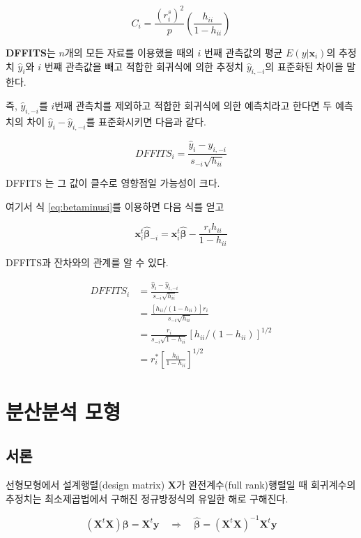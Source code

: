 \documentclass[
  10pt,
]{book}
\theoremstyle{definition}
\theoremstyle{definition}
\theoremstyle{definition}
\theoremstyle{definition}
\theoremstyle{remark}
\begin{document}
\[ C_i = \frac{ (r^s_i)^2}{p} \left ( \frac{h_{ii} }{1-h_{ii}} \right ) \]

\textbf{DFFITS}는 \(n\)개의 모든 자료를 이용했을 때의 \(i\) 번째 관측값의 평균
\(E(y|\bm x_i)\)의 추정치 \(\hat y_i\)와 \(i\) 번쨰 관측값을 빼고 적합한
회귀식에 의한 추정치 \(\hat y_{i,-i}\)의 표준화된 차이을 말한다.

즉, \(\hat y_{i,-i}\)를 \(i\)번째 관측치를 제외하고 적합한 회귀식에 의한
예측치라고 한다면 두 예측치의 차이 \(\hat y_i - \hat y_{i,-i}\)를
표준화시키면 다음과 같다.

\begin{equation}
 DFFITS_i = \frac{\hat y_i - \hat y_{i,-i}}{s_{-i}\sqrt{h_{ii}}}  
\label{eq:dffits}
\end{equation}

DFFITS 는 그 값이 클수로 영향점일 가능성이 크다.

여기서 식 \eqref{eq:betaminusi}를 이용하면 다음 식를 얻고

\[ {\bm x}_i^t \hat{ \bm \beta}_{-i} =\bm x_i^t \hat{ \bm \beta} -\frac{r_i h_{ii}}{1-h_{ii}}\]

DFFITS과 잔차와의 관계를 알 수 있다.

\begin{align*}
DFFITS_i & = \frac{\hat y_i - \hat y_{i,-i}}{s_{-i}\sqrt{h_{ii}}}  \\
& =  \frac{ [h_{ii}/(1-h_{ii})]r_i } {s_{-i}\sqrt{h_{ii}}} \\
& =  \frac{ r_i } {s_{-i}\sqrt{1-h_{ii}}} [h_{ii}/(1-h_{ii})]^{1/2} \\
&= r^*_i \left [\frac{h_{ii}}{1-h_{ii}} \right ]^{1/2}
\end{align*}

\hypertarget{notfullrank}{%
\chapter{분산분석 모형}\label{notfullrank}}

\hypertarget{uxc11cuxb860-1}{%
\section{서론}\label{uxc11cuxb860-1}}

선형모형에서 설계행렬(design matrix) \(\bm X\)가 완전계수(full rank)행렬일 때 회귀계수의 추정치는 최소제곱법에서 구해진 정규방정식의 유일한 해로 구해진다.

\[
(\bm X^t \bm X ) \bm \beta = \bm X^t \bm y \quad \Rightarrow \quad \hat {\bm \beta} = (\bm X^t \bm X )^{-1} \bm X^t \bm y 
\]
\end{document}
